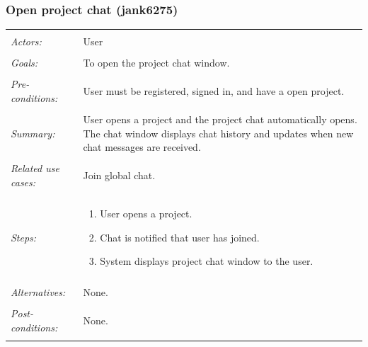 \documentclass[11pt]{report}
\begin{document}
\subsubsection{Open project chat (jank6275)}
\begin{tabular}{ p{2cm} p{12cm} }
 \hline
 \\
 \textit{Actors:} & User \\ 
 \\
 \textit{Goals:} & To open the project chat window. \\
 \\
 \textit{Pre-conditions:} & User must be registered, signed in, and have a open project.  \\
 \\
 \textit{Summary:} & User opens a project and the project chat automatically opens. The chat window displays chat history and updates when new chat messages are received. \\ 
 \\
 \textit{Related use cases:} & Join global chat. \\ 
 \\
 \textit{Steps:} & \begin{enumerate}
  \item User opens a project.
  \item Chat is notified that user has joined.
  \item System displays project chat window to the user.
 \end{enumerate} \\
 \\
 \textit{Alternatives:} & None. \\
 \\
 \textit{Post-conditions:} & None. \\
 \\
\hline
\end{tabular}
\end{document}
